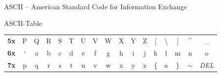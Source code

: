 \documentclass[xelatex,aspectratio=169]{beamer}
\begin{document}
\begin{frame}{ASCII -- American Standard Code for Information Exchange}
\begin{exampleblock}{ASCII-Table}
\begin{tabular}{lcccccccccccccccc}
            \textbf{5x} & P            & Q            & R            & S            & T            & U            & V            & W            & X            & Y                 & Z                 & [            & \textbackslash{} & ]           & \^{}        & \_           \\
            \textbf{6x} & `            & a            & b            & c            & d            & e            & f            & g            & h            & i                 & j                 & k            & l                & m           & n           & o            \\
            \textbf{7x} & p            & q            & r            & s            & t            & u            & v            & w            & x            & y                 & z                 & \{           & $a$              & \}          & $\sim$      & \textit{DEL} \\
            \bottomrule
        \end{tabular}
    \end{exampleblock}

\end{frame}
\end{document}
